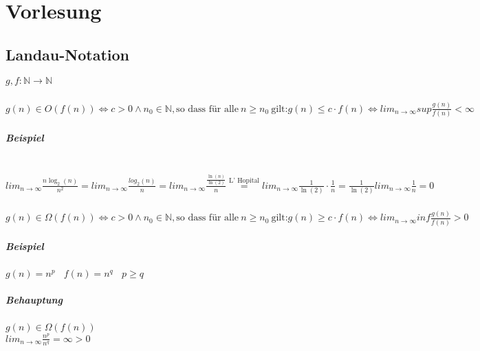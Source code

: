 \chapter{Vorlesung}


\section{Landau-Notation}

$g, f : \mathbb{N} \rightarrow \mathbb{N}$

\subsection{}
$g(n) \in O(f(n)) \Leftrightarrow c > 0 \land n_0 \in \mathbb{N}, \text{so dass für alle}~n \geq n_0~\text{gilt:} g(n) \leq c \cdot f(n) \Leftrightarrow lim_{n \rightarrow \infty} sup \frac{g(n)}{f(n)} < \infty$
\paragraph{Beispiel} \text{} \\
$lim_{n \rightarrow \infty} \frac{n \log_2(n)}{n^2} = lim_{n \rightarrow \infty} \frac{log_2(n)}{n} = lim_{n \rightarrow \infty} \frac{\frac{\ln(n)}{\ln(2)}}{n} \stackrel{\text{L' Hopital}}{=} lim_{n \rightarrow \infty} \frac{1}{\ln(2)} \cdot \frac{1}{n} = \frac{1}{\ln(2)} lim_{n \rightarrow \infty} \frac{1}{n} = 0$\\



\subsection{}
$g(n) \in \Omega(f(n)) \Leftrightarrow c > 0 \land n_0 \in \mathbb{N}, \text{so dass für alle}~n \geq n_0~\text{gilt:} g(n) \geq c \cdot f(n) \Leftrightarrow lim_{n \rightarrow \infty} inf \frac{g(n)}{f(n)} > 0$
\paragraph{Beispiel} $g(n) = n^p~~~~f(n)=n^q~~~~p \geq q$
\paragraph{Behauptung} $g(n) \in \Omega(f(n))$\\

$lim_{n \rightarrow \infty} \frac{n^p}{n^q} = \infty > 0$\\


